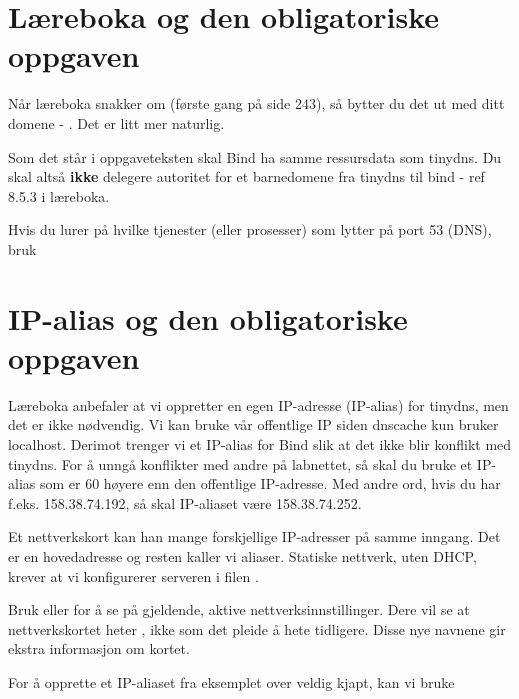 \section{Læreboka og den obligatoriske oppgaven}

Når læreboka snakker om  (første gang på side 243),
så bytter du det ut med ditt domene - . Det er litt 
mer naturlig.

Som det står i oppgaveteksten skal Bind ha samme ressursdata som
tinydns. Du skal altså \textbf{ikke} delegere autoritet for et barnedomene fra
tinydns til bind - ref 8.5.3 i læreboka.

Hvis du lurer på hvilke tjenester (eller prosesser)
som lytter på port 53 (DNS), bruk


\section{IP-alias og den obligatoriske oppgaven}

Læreboka anbefaler at vi oppretter en egen IP-adresse (IP-alias) for tinydns, 
men det er ikke nødvendig. Vi kan bruke vår offentlige IP siden dnscache kun bruker localhost.
Derimot trenger vi et IP-alias for Bind slik at det ikke blir konflikt med tinydns.
For å unngå konflikter med andre på labnettet, så skal du bruke et IP-alias
som er 60 høyere enn den offentlige IP-adresse. Med andre ord, hvis du 
har f.eks. 158.38.74.192, så skal IP-aliaset være 158.38.74.252.

Et nettverkskort kan han mange forskjellige IP-adresser på samme inngang. 
Det er en hovedadresse og resten kaller vi aliaser. 
Statiske nettverk, uten DHCP, krever at vi konfigurerer 
serveren i filen . 

Bruk  eller  for å se på gjeldende, aktive nettverksinnstillinger.
Dere vil se at nettverkskortet heter , ikke  som det pleide 
å hete tidligere. Disse nye navnene gir ekstra informasjon om kortet.

For å opprette et IP-aliaset fra eksemplet over veldig kjapt, kan vi bruke

